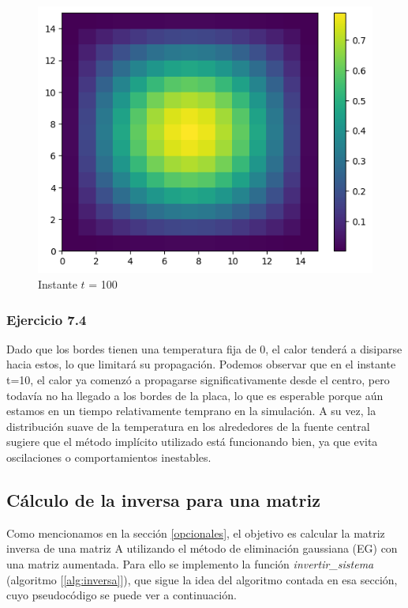 \begin{figure}[H]
\begin{minipage}[b]{0.5\linewidth}
      \end{minipage}%
      \begin{minipage}[b]{0.5\linewidth}
       \centering
       \includegraphics[width=.5\linewidth]{./img/instante_100.png}
      \caption{Instante $t$ = 100}\label{instante100}
        \vspace{4ex}
      \end{minipage} 
    \end{figure}


    \subsubsection{Ejercicio 7.4}
    Dado que los bordes tienen una temperatura fija de 0, el calor tenderá a disiparse hacia estos, lo que limitará su propagación.
    Podemos observar que en el instante t=10, el calor ya comenzó a propagarse significativamente desde el centro, pero todavía no ha llegado a los bordes de la placa, lo que es esperable porque aún estamos en un tiempo relativamente temprano en la simulación. A su vez, la distribución suave de la temperatura en los alrededores de la fuente central sugiere que el método implícito utilizado está funcionando bien, ya que evita oscilaciones o comportamientos inestables.
\fi


 \subsection{Cálculo de la inversa para una matriz}

 Como mencionamos en la sección \ref{opcionales}, el objetivo es calcular la matriz inversa de una matriz A utilizando el método de eliminación gaussiana (EG) con una matriz aumentada. Para ello se implemento la función \textit{invertir\_sistema} (algoritmo [\ref{alg:inversa}]), que sigue la idea del algoritmo contada en esa sección, cuyo pseudocódigo se puede ver a continuación.
 
